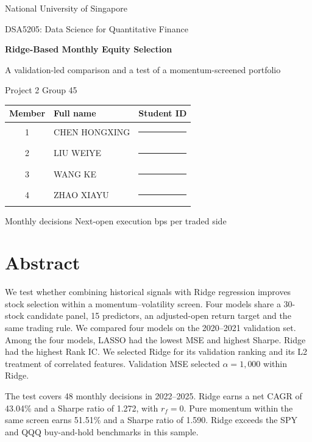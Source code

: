 \documentclass[11pt,a4paper]{article}
\newcommand{\rfzero}{\(r_f=0\)}
\begin{document}
\begin{titlepage}
\centering
\vspace*{2.5cm}
{\large National University of Singapore\par}
\vspace{0.3cm}
{\large DSA5205: Data Science for Quantitative Finance\par}
\vspace{2.2cm}
{\LARGE\bfseries Ridge-Based Monthly Equity Selection\par}
\vspace{0.7cm}
{\Large A validation-led comparison and a test of a momentum-screened portfolio\par}
\vspace{1.8cm}
{\large Project 2 \quad Group 45\par}
\vspace{1cm}
\begin{tabular}{cll}
\toprule
Member & Full name & Student ID \\
\midrule
1 & CHEN HONGXING & \rule{3cm}{0.35pt} \\
2 & LIU WEIYE & \rule{3cm}{0.35pt} \\
3 & WANG KE & \rule{3cm}{0.35pt} \\
4 & ZHAO XIAYU & \rule{3cm}{0.35pt} \\
\bottomrule
\end{tabular}
\vfill
Monthly decisions \quad Next-open execution  bps per traded side
\end{titlepage}
\setcounter{page}{2}

\section*{Abstract}
We test whether combining historical signals with Ridge regression improves stock selection within a momentum--volatility screen. Four models share a 30-stock candidate panel, 15 predictors, an adjusted-open return target and the same trading rule. We compared four models on the 2020--2021 validation set. Among the four models, LASSO had the lowest MSE and highest Sharpe. Ridge had the highest Rank IC. We selected Ridge for its validation ranking and its L2 treatment of correlated features. Validation MSE selected \(\alpha=1{,}000\) within Ridge.

The test covers 48 monthly decisions in 2022--2025. Ridge earns a net CAGR of 43.04\% and a Sharpe ratio of 1.272, with \rfzero. Pure momentum within the same screen earns 51.51\% and a Sharpe ratio of 1.590. Ridge exceeds the SPY and QQQ buy-and-hold benchmarks in this sample.
\end{document}
